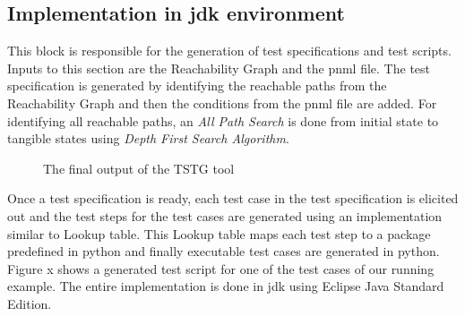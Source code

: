 \subsection{Implementation in \gls{jdk} environment}
This block is responsible for the generation of test specifications and test scripts. Inputs to this section are the Reachability Graph and the \gls{pnml} file. The test specification is generated by identifying the reachable paths from the Reachability Graph and then the conditions from the \gls{pnml} file are added. For identifying all reachable paths, an \textit{All Path Search} is done from initial state to tangible states using \textit{Depth First Search Algorithm}.

\begin{figure}[htb!]
\centering
{}
\caption{The final output of the TSTG tool}
\label{fig:testscript}
\end{figure}

Once a test specification is ready, each test case in the test specification is elicited out and the test steps for the test cases are generated using an implementation similar to Lookup table. This Lookup table maps each test step to a package predefined in python and finally executable test cases are generated in python. Figure x shows a generated test script for one of the test cases of our running example. The entire implementation is done in \gls{jdk} using Eclipse Java Standard Edition.
